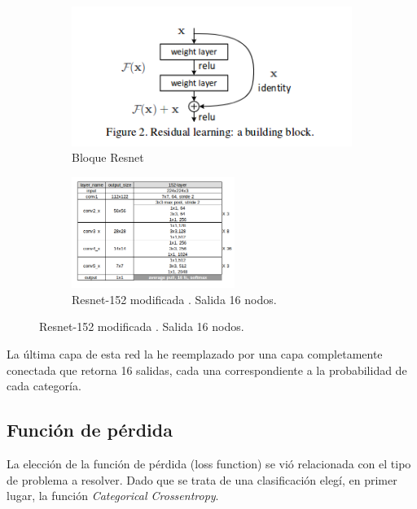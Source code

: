 \documentclass{article}[9pt]
\begin{document}
\begin{figure}[H]

  \begin{subfigure}{.4\textwidth}
  \begin{center}
    \includegraphics[width=\linewidth]{img/resnet_connection.png}
    \caption{Bloque Resnet}
  \end{center}
\end{subfigure}
\begin{subfigure}{.6\textwidth}
  \begin{center}
    \includegraphics[width=200px]{img/network.png}
    \caption{Resnet-152 modificada . Salida 16 nodos. }
 \end{center}
\end{subfigure}
\end{figure}

La última capa de esta red la he reemplazado por una capa completamente conectada que retorna 16 salidas, cada una correspondiente a la probabilidad de cada categoría. 


\subsection{Función de pérdida}

La elección de la función de pérdida (loss function) se vió relacionada con el tipo de problema a resolver. Dado que se trata de una clasificación elegí, en primer lugar, la función \textit{Categorical Crossentropy}. 
\end{document}
